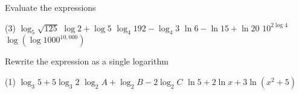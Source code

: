\begin{Exercise}[title={Logarithmic Functions},label=exLogFunctions]
\Question Evaluate the expressions
\begin{tasks}(3)
	\task $\log _{5} \sqrt{125}$	%
	\task $\log  2 +\log  5$		%
	\task $\log _{4} 192 -\log _{4} 3$	%
	\task $\ln  6 -\ln  15 +\ln  20$	%
	\task $10^{2 \log  4}$ 			%
	\task $\log  \left (\log  1000^{10,000}\right )$	%
\end{tasks}
	
	\Question Rewrite the expression as a single logarithm
	\begin{tasks}(1)
		\task $\log _{3} 5 +5 \log _{3} 2$	%
		\task $\log _{2} A +\log _{2} B -2 \log _{2} C$%
		\task $\ln  5 +2 \ln  x +3 \ln  \left (x^{2} +5\right )$ %
		\end{tasks}
	

\end{Exercise}	
